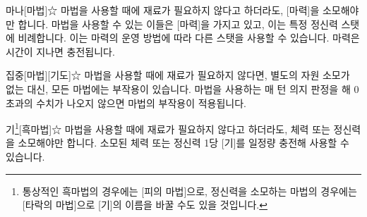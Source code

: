 \documentclass{report}
\begin{document}
	\begin{story}{마나}{[마법]☆}
		마법을 사용할 때에 재료가 필요하지 않다고 하더라도, [마력]을 소모해야만 합니다. 마법을 사용할 수 있는 이들은 [마력]을 가지고 있고, 이는 특정 정신력 스탯에 비례합니다. 이는 마력의 운영 방법에 따라 다른 스탯을 사용할 수 있습니다. 마력은 시간이 지나면 충전됩니다.
	\end{story}

	\begin{story}{집중}{[마법][기도]☆}
		마법을 사용할 때에 재료가 필요하지 않다면, 별도의 자원 소모가 없는 대신, 모든 마법에는 부작용이 있습니다. 마법을 사용하는 매 턴 의지 판정을 해 0 초과의 수치가 나오지 않으면 마법의 부작용이 적용됩니다.
	\end{story}
	
	\begin{story}{기\footnote{통상적인 흑마법의 경우에는 [피의 마법]으로, 정신력을 소모하는 마법의 경우에는 [타락의 마법]으로 [기]의 이름을 바꿀 수도 있을 것입니다.}}{[흑마법]☆}
		마법을 사용할 때에 재료가 필요하지 않다고 하더라도, 체력 또는 정신력을 소모해야만 합니다. 소모된 체력 또는 정신력 1당 [기]를 일정량 충전해 사용할 수 있습니다.
	\end{story}
\end{document}
